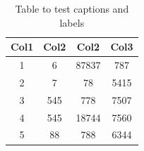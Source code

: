 \begin{table}[h]
\centering
\begin{tabular}{|c|c|c|c|} 
 \hline
 \rowcolor[gray]{0.75} \textbf{Col1} & \textbf{Col2} & \textbf{Col2} & \textbf{Col3} \\
 \hline
 1 & 6 & 87837 & 787 \\ 
 \hline 
 2 & 7 & 78 & 5415 \\
 \hline 
 3 & 545 & 778 & 7507 \\
 \hline
 4 & 545 & 18744 & 7560 \\
 \hline
 5 & 88 & 788 & 6344 \\
 \hline
\end{tabular}
\caption{Table to test captions and labels}
\label{table:test}
\end{table}

\blindtext

\newpage

